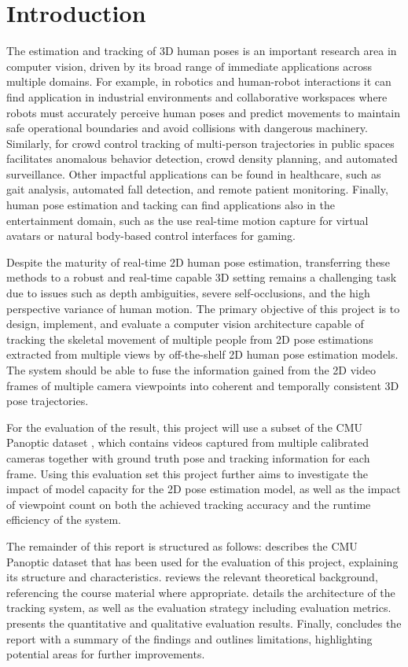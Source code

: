 
\section{Introduction} \label{into}

The estimation and tracking of 3D human poses is an important research area in computer vision, driven by its broad range of immediate applications across multiple domains. For example, in robotics and human-robot interactions it can find application in industrial environments and collaborative workspaces where robots must accurately perceive human poses and predict movements to maintain safe operational boundaries and avoid collisions with dangerous machinery. Similarly, for crowd control tracking of multi-person trajectories in public spaces facilitates anomalous behavior detection, crowd density planning, and automated surveillance. Other impactful applications can be found in healthcare, such as gait analysis, automated fall detection, and remote patient monitoring. Finally, human pose estimation and tacking can find applications also in the entertainment domain, such as the use real-time motion capture for virtual avatars or natural body-based control interfaces for gaming.

Despite the maturity of real-time 2D human pose estimation, transferring these methods to a robust and real-time capable 3D setting remains a challenging task due to issues such as depth ambiguities, severe self-occlusions, and the high perspective variance of human motion. The primary objective of this project is to design, implement, and evaluate a computer vision architecture capable of tracking the skeletal movement of multiple people from 2D pose estimations extracted from multiple views by off-the-shelf 2D human pose estimation models. The system should be able to fuse the information gained from the 2D video frames of multiple camera viewpoints into coherent and temporally consistent 3D pose trajectories.

For the evaluation of the result, this project will use a subset of the CMU Panoptic dataset \parencite{Joo_2015_ICCV,Joo_2017_TPAMI}, which contains videos captured from multiple calibrated cameras together with ground truth pose and tracking information for each frame. Using this evaluation set this project further aims to investigate the impact of model capacity for the 2D pose estimation model, as well as the impact of viewpoint count on both the achieved tracking accuracy and the runtime efficiency of the system.

The remainder of this report is structured as follows:  describes the CMU Panoptic dataset that has been used for the evaluation of this project, explaining its structure and characteristics.  reviews the relevant theoretical background, referencing the course material where appropriate.  details the architecture of the tracking system, as well as the evaluation strategy including evaluation metrics.  presents the quantitative and qualitative evaluation results. Finally,  concludes the report with a summary of the findings and outlines limitations, highlighting potential areas for further improvements.
